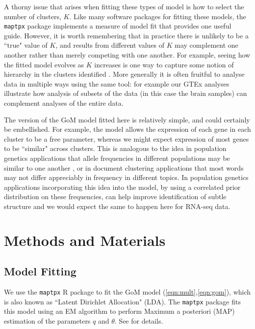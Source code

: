 \documentclass[10pt,letterpaper]{article}
\begin{document}
A thorny issue that arises when fitting these types of model is how to select the number of clusters, $K$. Like many software packages
for fitting these models, the {\tt maptpx} package implements a measure of model fit that provides one useful guide. However, it is
worth remembering that in practice there is unlikely to be a ``true" value of $K$, and results from different
values of $K$ may complement one another rather than merely competing with one another. For example, seeing how the fitted model evolves
as $K$ increases is one way to capture some notion of hierarchy in the clusters identified \cite{Rosenberg2002}. More generally it is often
fruitful to analyse data in multiple ways using the same tool: for example our GTEx analyses illustrate how
analysis of subsets of the data (in this case the brain samples) can complement analyses of the entire data.

The version of the GoM model fitted here is relatively simple, and could certainly be embellished. For example,
the model allows the expression of each gene in each cluster to be a free parameter, whereas we might expect expression of most
genes to be ``similar" across clusters. This is analogous to the idea in population genetics applications that allele frequencies in different populations may
be similar to one another \cite{Falush2003}, or in document clustering applications that most words may not differ appreciably in frequency in different topics.
In population genetics applications incorporating this idea into the model, by using a correlated prior distribution on these frequencies,
can help improve identification of subtle structure \cite{Falush2003} and we would expect the same to happen here for RNA-seq data.



\section*{Methods and Materials}

\subsection*{Model Fitting}

We use the {\tt maptpx} R package \cite{Taddy2012} to fit the GoM model (\ref{eqn:mult},\ref{eqn:gom}), which is also known as ``Latent Dirichlet Allocation" (LDA).
The {\tt maptpx} package fits this model using an EM algorithm to perform Maximum a posteriori (MAP)  estimation of the parameters $q$ and $\theta$. See \cite{Taddy2012} for details.
\end{document}
